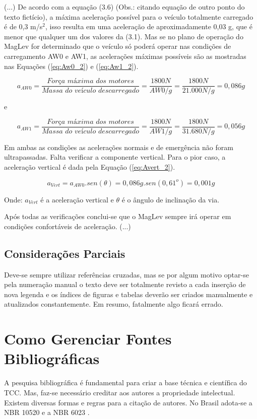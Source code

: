 \documentclass[
        oneside,      %
        english,			
        brazil			 
        ]{configcefetmglpd}
\begin{document}
(...) De acordo com a equação (3.6) (Obs.: citando equação de outro ponto do texto fictício), a máxima aceleração possível para o veículo totalmente carregado é de 0,3 m/s$^2$, isso resulta em uma aceleração de aproximadamente 0,03 g, que é menor que qualquer um dos valores da (3.1). Mas se no plano de operação do MagLev for determinado que o veículo só poderá operar nas condições de carregamento AW0 e AW1, as acelerações máximas possíveis são as mostradas nas Equações (\ref{eq:Aw0_2}) e (\ref{eq:Aw1_2}).

\begin{equation}
	\label{eq:Aw0_2}
	a_{AW0} = \frac{\textit{Força~máxima~dos~motores}}{\textit{Massa~do~veículo~descarregado}} = \frac{1800N}{AW0/g}
	=\frac{1800N}{21.000N/g}=0,086g
\end{equation}

e

\begin{equation}
	\label{eq:Aw1_2}
	a_{AW1} = \frac{\textit{Força~máxima~dos~motores}}{\textit{Massa~do~veículo~descarregado}} = \frac{1800N}{AW1/g}
	=\frac{1800N}{31.680N/g}=0,056g
\end{equation}

Em ambas as condições as acelerações normais e de emergência não foram ultrapassadas. Falta verificar a componente vertical. Para o pior caso, a aceleração vertical é dada pela Equação (\ref{eq:Avert_2}).

\begin{equation}
	\label{eq:Avert_2}
	a_{Vert} = a_{AW0}.sen(\theta)=0,086g.sen(0,61^o)=0,001g
\end{equation}

Onde: $a_{Vert}$ é a aceleração vertical e $\theta$ é o ângulo de inclinação da via.

Após todas as verificações conclui-se que o MagLev sempre irá operar em condições confortáveis de aceleração. (...)

\section{Considerações Parciais}
Deve-se sempre utilizar referências cruzadas, mas se por algum motivo optar-se pela numeração manual o texto deve ser totalmente revisto a cada inserção de nova legenda e os índices de figuras e tabelas deverão ser criados manualmente e atualizados constantemente. Em resumo, fatalmente algo ficará errado.

\chapter{Como Gerenciar Fontes Bibliográficas}
A pesquisa bibliográfica é fundamental para criar a base técnica e científica do TCC. Mas, faz-se necessário creditar aos autores a propriedade intelectual. Existem diversas formas e regras para a citação de autores. No Brasil adota-se a NBR 10520 \cite{bib:abnt10520} e a NBR 6023 \cite{bib:abnt6023}.
\end{document}
